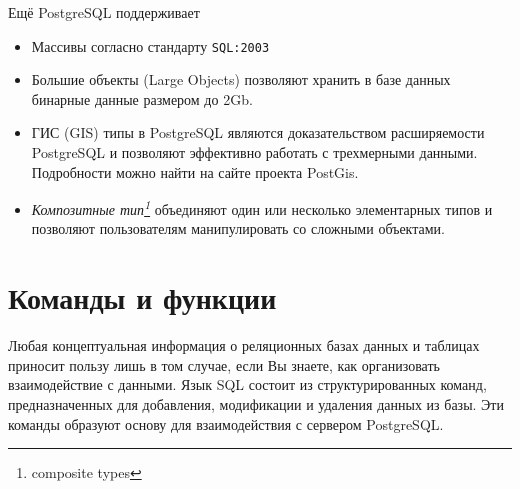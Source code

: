 \documentclass[a4paper,12pt,notitlepage,headsepline,pdftex]{scrartcl}
\begin{document}
  Ещё PostgreSQL поддерживает
  \begin{itemize}
    \item Массивы согласно стандарту \verb'SQL:2003'
    \item Большие объекты (Large Objects) позволяют хранить в базе данных
      бинарные данные размером до 2Gb.
    \item ГИС (GIS) типы в PostgreSQL являются доказательством расширяемости
      PostgreSQL и позволяют эффективно работать с трехмерными данными.
      Подробности можно найти на сайте проекта PostGis.
    \item \emph{Композитные тип\footnote{composite types}} объединяют один или
      несколько элементарных типов и позволяют пользователям манипулировать со
      сложными объектами.
  \end{itemize}

  \pagebreak
\section{Команды и функции}
  Любая концептуальная информация о реляционных базах данных и таблицах
  приносит пользу лишь в том случае, если Вы знаете, как организовать
  взаимодействие с данными.
  Язык SQL состоит из структурированных команд, предназначенных для
  добавления, модификации и удаления данных из базы.
  Эти команды образуют основу для взаимодействия с сервером PostgreSQL.
\end{document}
